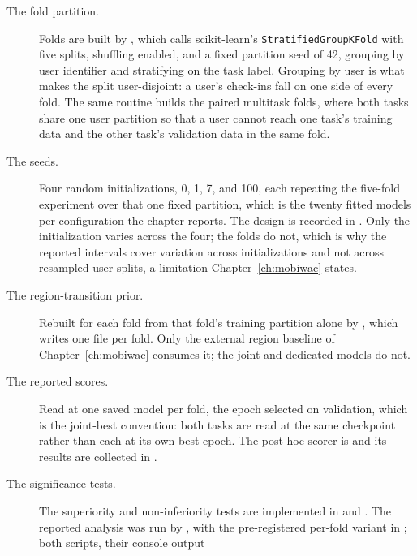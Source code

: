 \begin{description}
  \item[The fold partition.] Folds are built by
        , which calls scikit-learn's
        \texttt{StratifiedGroupKFold} with five splits, shuffling enabled, and a fixed
        partition seed of 42, grouping by user identifier and stratifying on the task
        label. Grouping by user is what makes the split user-disjoint: a user's
        check-ins fall on one side of every fold. The same routine builds the paired
        multitask folds, where both tasks share one user partition so that a user
        cannot reach one task's training data and the other task's validation data in
        the same fold.
  \item[The seeds.] Four random initializations, 0, 1, 7, and 100, each repeating the
        five-fold experiment over that one fixed partition, which is the twenty fitted
        models per configuration the chapter reports. The design is recorded in
        . Only
        the initialization varies across the four; the folds do not, which is why the
        reported intervals cover variation across initializations and not across
        resampled user splits, a limitation Chapter~\ref{ch:mobiwac} states.
  \item[The region-transition prior.] Rebuilt for each fold from that fold's training
        partition alone by
        , which writes one file per
        fold. Only the external region baseline of Chapter~\ref{ch:mobiwac} consumes
        it; the joint and dedicated models do not.
  \item[The reported scores.] Read at one saved model per fold, the epoch selected on
        validation, which is the joint-best convention: both tasks are read at the same
        checkpoint rather than each at its own best epoch. The post-hoc scorer is
         and its results are collected in
        .
  \item[The significance tests.] The superiority and non-inferiority tests are
        implemented in  and
        . The reported analysis was run
        by , with the pre-registered per-fold variant in
        ; both scripts, their console output

\end{description}
